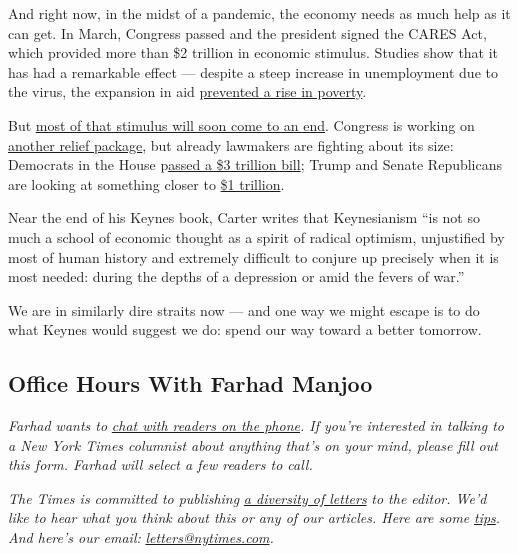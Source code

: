 And right now, in the midst of a pandemic, the economy needs as much
help as it can get. In March, Congress passed and the president signed
the CARES Act, which provided more than \$2 trillion in economic
stimulus. Studies show that it has had a remarkable effect --- despite a
steep increase in unemployment due to the virus, the expansion in aid
\href{https://www.nytimes.com/2020/06/21/us/politics/coronavirus-poverty.html}{prevented
a rise in poverty}.

But
\href{https://www.nytimes.com/2020/06/21/us/politics/coronavirus-poverty.html}{most
of that stimulus will soon come to an end}. Congress is working on
\href{https://www.cnn.com/2020/07/21/politics/stimulus-negotiations-congress-latest/index.html}{another
relief package}, but already lawmakers are fighting about its size:
Democrats in the House
p\href{https://www.nytimes.com/2020/05/15/us/politics/house-simulus-vote.html}{assed
a \$3 trillion bill}; Trump and Senate Republicans are looking at
something closer to
\href{https://www.cbsnews.com/news/coronavirus-relief-bill-phase-4-trump-republicans-1-trillion/}{\$1
trillion}.

Near the end of his Keynes book, Carter writes that Keynesianism ``is
not so much a school of economic thought as a spirit of radical
optimism, unjustified by most of human history and extremely difficult
to conjure up precisely when it is most needed: during the depths of a
depression or amid the fevers of war.''

We are in similarly dire straits now --- and one way we might escape is
to do what Keynes would suggest we do: spend our way toward a better
tomorrow.

\hypertarget{office-hours-with-farhad-manjoo}{%
\subsection{Office Hours With Farhad
Manjoo}\label{office-hours-with-farhad-manjoo}}

\emph{Farhad wants to}
\href{https://www.nytimes.com/2019/05/16/opinion/farhad-office-hours.html?module=inline}{\emph{chat
with readers on the phone}}\emph{. If you're interested in talking to a
New York Times columnist about anything that's on your mind, please fill
out this form. Farhad will select a few readers to call.}

\emph{The Times is committed to publishing}
\href{https://www.nytimes.com/2019/01/31/opinion/letters/letters-to-editor-new-york-times-women.html}{\emph{a
diversity of letters}} \emph{to the editor. We'd like to hear what you
think about this or any of our articles. Here are some}
\href{https://help.nytimes.com/hc/en-us/articles/115014925288-How-to-submit-a-letter-to-the-editor}{\emph{tips}}\emph{.
And here's our email:}
\href{mailto:letters@nytimes.com}{\emph{letters@nytimes.com}}\emph{.}

